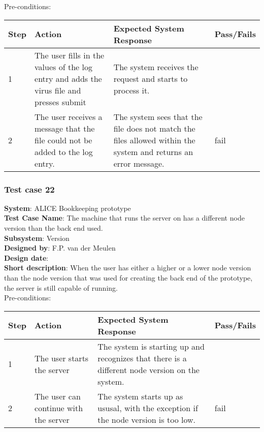 Pre-conditions: \\

\begin{longtable}{ | p{0.8cm} | p{4.5cm} | p{6cm} | p{1.5cm} |}
\hline
Step & Action & Expected System Response & Pass/Fails  \\ \hline
1 & The user fills in the values of the log entry and adds the virus file and presses submit & The system receives the request and starts to process it. &  \\ \hline
2 & The user receives a message that the file could not be added to the log entry. & The system sees that the file does not match the files allowed within the system and returns an error message. & fail\\ \hline
 
\end{longtable}
\subsubsection{Test case 22}
\textbf{System}:  ALICE Bookkeeping prototype \\
\textbf{Test Case Name}:  The machine that runs the server on has a different node version than the back end used.  \\
\textbf{Subsystem}:  Version \\
\textbf{Designed by}:  F.P. van der Meulen\\
\textbf{Design date}:  \\
\textbf{Short description}: When the user has either a higher or a lower node version than the node version that was used for creating the back end of the prototype, the server is still capable of running. \\

Pre-conditions: \\

\begin{longtable}{ | p{0.8cm} | p{4.5cm} | p{6cm} | p{1.5cm} |}
\hline
Step & Action & Expected System Response & Pass/Fails  \\ \hline
1 & The user starts the server & The system is starting up and recognizes that there is a different node version on the system. &  \\ \hline
2 & The user can continue with the server & The system starts up as ususal, with the exception if the node version is too low. & fail\\ \hline
 
\end{longtable}